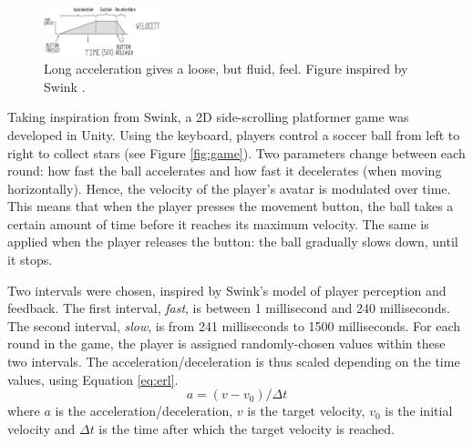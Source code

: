 \begin{figure}[htbp]
\centering
\includegraphics[width=0.30\textwidth]{Pics/adsr_loose}
\caption{Long acceleration gives a loose, but fluid, feel. Figure inspired by Swink \cite{swink}.}
\label{fig:adsr_loose}
\end{figure}

Taking inspiration from Swink, a 2D side-scrolling platformer game was developed in Unity. Using the keyboard, players control a soccer ball from left to right to collect stars (see Figure \ref{fig:game}). Two parameters change between each round: how fast the ball accelerates and how fast it decelerates (when moving horizontally). Hence, the velocity of the player's avatar is modulated over time. This means that when the player presses the movement button, the ball takes a certain amount of time before it reaches its maximum velocity. The same is applied when the player releases the button: the ball gradually slows down, until it stops.



Two intervals were chosen, inspired by Swink's model of player perception and feedback. The first interval, \textit{fast}, is between 1 millisecond and 240 milliseconds. The second interval, \textit{slow}, is from 241 milliseconds to 1500 milliseconds. For each round in the game, the player is assigned randomly-chosen values within these two intervals. 
The acceleration/deceleration is thus scaled depending on the time values, using Equation \ref{eq:erl}.
\begin{equation} \label{eq:erl} %
a = (v - v_0)/{\Delta}t
\end{equation} 
where $a$ is the acceleration/deceleration, $v$ is the target velocity, $v_0$ is the initial velocity and ${\Delta}t$ is the time after which the target velocity is reached.

